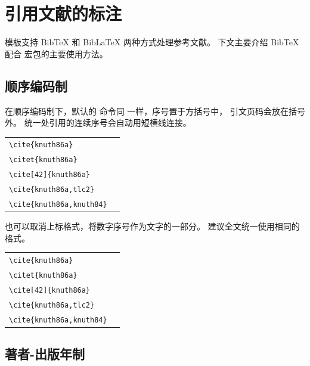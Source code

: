 \chapter{引用文献的标注}

模板支持 BibTeX 和 BibLaTeX 两种方式处理参考文献。
下文主要介绍 BibTeX 配合  宏包的主要使用方法。


\section{顺序编码制}

在顺序编码制下，默认的  命令同  一样，序号置于方括号中，
引文页码会放在括号外。
统一处引用的连续序号会自动用短横线连接。

\noindent
\begin{tabular}{l@{\quad$\Rightarrow$\quad}l}
  \verb|\cite{knuth86a}|         & \cite{knuth86a}         \\
  \verb|\citet{knuth86a}|        & \citet{knuth86a}        \\
  \verb|\cite[42]{knuth86a}|     & \cite[42]{knuth86a}     \\
  \verb|\cite{knuth86a,tlc2}|    & \cite{knuth86a,tlc2}    \\
  \verb|\cite{knuth86a,knuth84}| & \cite{knuth86a,knuth84} \\
\end{tabular}


也可以取消上标格式，将数字序号作为文字的一部分。
建议全文统一使用相同的格式。

\noindent
\begin{tabular}{l@{\quad$\Rightarrow$\quad}l}
  \verb|\cite{knuth86a}|         & \cite{knuth86a}         \\
  \verb|\citet{knuth86a}|        & \citet{knuth86a}        \\
  \verb|\cite[42]{knuth86a}|     & \cite[42]{knuth86a}     \\
  \verb|\cite{knuth86a,tlc2}|    & \cite{knuth86a,tlc2}    \\
  \verb|\cite{knuth86a,knuth84}| & \cite{knuth86a,knuth84} \\
\end{tabular}



\section{著者-出版年制}

